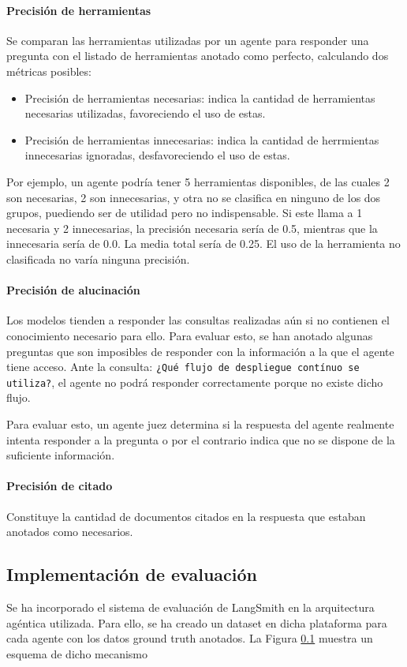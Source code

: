 \paragraph{Precisión de herramientas}Se comparan las herramientas utilizadas por un agente para responder una pregunta con el listado de herramientas anotado como perfecto, calculando dos métricas posibles: 
\begin{itemize}
  \item Precisión de herramientas necesarias: indica la cantidad de herramientas necesarias utilizadas, favoreciendo el uso de estas.
  \item Precisión de herramientas innecesarias: indica la cantidad de herrmientas innecesarias ignoradas, desfavoreciendo el uso de estas.  
\end{itemize}

Por ejemplo, un agente podría tener 5 herramientas disponibles, de las cuales 2 son necesarias, 2 son innecesarias, y otra no se clasifica en ninguno de los dos grupos, puediendo ser de utilidad pero no indispensable. Si este llama a 1 necesaria y 2 innecesarias, la precisión necesaria sería de 0.5, mientras que la innecesaria sería de 0.0. La media total sería de 0.25. El uso de la herramienta no clasificada no varía ninguna precisión.  

\paragraph{Precisión de alucinación}Los modelos tienden a responder las consultas realizadas aún si no contienen el conocimiento necesario para ello. Para evaluar esto, se han anotado algunas preguntas que son imposibles de responder con la información a la que el agente tiene acceso. Ante la consulta: \texttt{¿Qué flujo de despliegue contínuo se utiliza?}, el agente no podrá responder correctamente porque no existe dicho flujo.

Para evaluar esto, un agente juez determina si la respuesta del agente realmente intenta responder a la pregunta o por el contrario indica que no se dispone de la suficiente información.

\paragraph{Precisión de citado}Constituye la cantidad de documentos citados en la respuesta que estaban anotados como necesarios.   

\subsection{Implementación de evaluación}
Se ha incorporado el sistema de evaluación de LangSmith en la arquitectura agéntica utilizada. Para ello, se ha creado un dataset en dicha plataforma para cada agente con los datos ground truth anotados. La Figura \ref{} muestra un esquema de dicho mecanismo


